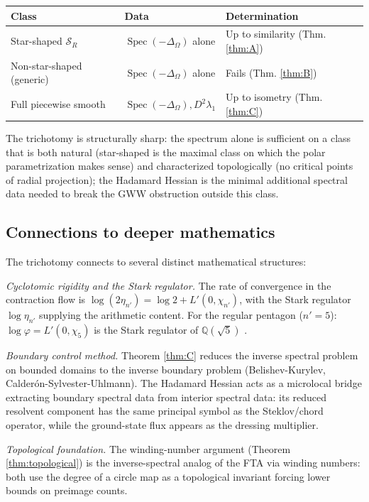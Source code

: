 \documentclass[11pt,reqno]{amsart}
\theoremstyle{plain}
\theoremstyle{definition}
\theoremstyle{remark}
\DeclareMathOperator{\Spec}{Spec}
\newcommand{\Rats}{\mathbb{Q}}
\newcommand{\Scal}{\mathcal{S}}
\begin{document}
\begin{center}
\begin{tabular}{l|l|l}
Class & Data & Determination \\
\hline
Star-shaped $\Scal_R$ & $\Spec(-\Delta_\Omega)$ alone & Up to similarity (Thm. \ref{thm:A}) \\
Non-star-shaped (generic) & $\Spec(-\Delta_\Omega)$ alone & Fails (Thm. \ref{thm:B}) \\
Full piecewise smooth & $\Spec(-\Delta_\Omega), D^2\lambda_1$ & Up to isometry (Thm. \ref{thm:C}) \\
\end{tabular}
\end{center}

The trichotomy is structurally sharp: the spectrum alone is sufficient on a class that is both natural (star-shaped is the maximal class on which the polar parametrization makes sense) and characterized topologically (no critical points of radial projection); the Hadamard Hessian is the minimal additional spectral data needed to break the GWW obstruction outside this class.

\subsection{Connections to deeper mathematics}\label{ss:connections}

The trichotomy connects to several distinct mathematical structures:

\emph{Cyclotomic rigidity and the Stark regulator.} The rate of convergence in the contraction flow is $\log(2\eta_{n'}) = \log 2 + L'(0, \chi_{n'})$, with the Stark regulator $\log\eta_{n'}$ supplying the arithmetic content. For the regular pentagon ($n' = 5$): $\log\varphi = L'(0, \chi_5)$ is the Stark regulator of $\Rats(\sqrt 5)$ \cite{ChowlaSelberg, Stark}.

\emph{Boundary control method.} Theorem \ref{thm:C} reduces the inverse spectral problem on bounded domains to the inverse boundary problem (Belishev-Kurylev, Calderón-Sylvester-Uhlmann). The Hadamard Hessian acts as a microlocal bridge extracting boundary spectral data from interior spectral data: its reduced resolvent component has the same principal symbol as the Steklov/chord operator, while the ground-state flux appears as the dressing multiplier.

\emph{Topological foundation.} The winding-number argument (Theorem \ref{thm:topological}) is the inverse-spectral analog of the FTA via winding numbers: both use the degree of a circle map as a topological invariant forcing lower bounds on preimage counts.
\end{document}
